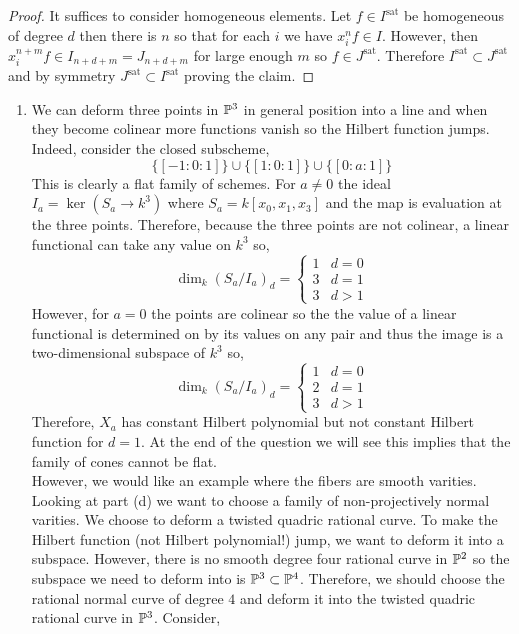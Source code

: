 \documentclass[12pt]{article}
\begin{document}
\begin{proof}
It suffices to consider homogeneous elements. Let $f \in I^{\text{sat}}$ be homogeneous of degree $d$ then there is $n$ so that for each $i$ we have $x_i^n f \in I$. However, then $x_i^{n+m} f \in I_{n+d+m} = J_{n+d+m}$ for large enough $m$ so $f \in J^{\text{sat}}$.  Therefore $I^{\text{sat}} \subset J^{\text{sat}}$ and by symmetry $J^{\text{sat}} \subset I^{\text{sat}}$ proving the claim. 
\end{proof}

\newcommand{\sS}{\mathscr{S}}

\begin{enumerate}
\item We can deform three points in $\P^3$ in general position into a line and when they become colinear more functions vanish so the Hilbert function jumps. Indeed, consider the closed subscheme,
\[ \{ [-1 : 0 : 1] \} \cup \{ [1 : 0 : 1] \} \cup \{ [0 : a : 1] \} \]
This is clearly a flat family of schemes. For $a \neq 0$ the ideal $I_a = \ker{(S_a \to k^3)}$ where $S_a = k[x_0, x_1, x_3]$ and the map is evaluation at the three points. Therefore, because the three points are not colinear, a linear functional can take any value on $k^3$ so,
\[ \dim_{k} (S_a/I_a)_d = 
\begin{cases}
1 & d = 0
\\
3 & d = 1
\\
3 & d > 1
\end{cases} \]
However, for $a = 0$ the points are colinear so the the value of a linear functional is determined on by its values on any pair and thus the image is a two-dimensional subspace of $k^3$ so,
\[ \dim_{k} (S_a/I_a)_d = 
\begin{cases}
1 & d = 0
\\
2 & d = 1
\\
3 & d > 1
\end{cases} \]
Therefore, $X_a$ has constant Hilbert polynomial but not constant Hilbert function for $d = 1$. At the end of the question we will see this implies that the family of cones cannot be flat. 
\bigskip\\
However, we would like an example where the fibers are smooth varities.
Looking at part (d) we want to choose a family of non-projectively normal varities. We choose to deform a twisted quadric rational curve. To make the Hilbert function (not Hilbert polynomial!) jump, we want to deform it into a subspace. However, there is no smooth degree four rational curve in $\P^2$ so the subspace we need to deform into is $\P^3 \subset \P^4$. Therefore, we should choose the rational normal curve of degree $4$ and deform it into the twisted quadric rational curve in $\P^3$. Consider,

\end{enumerate}
\end{document}

